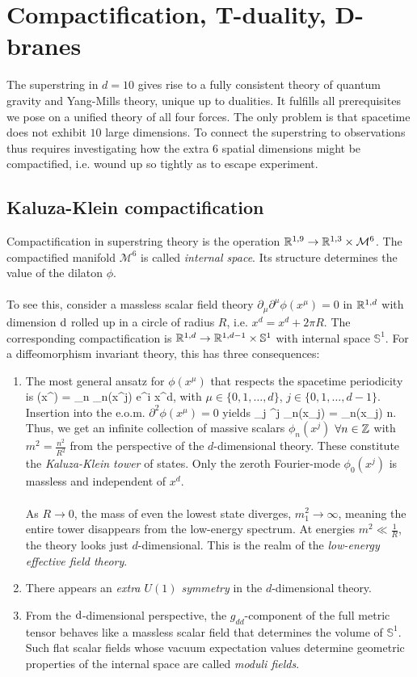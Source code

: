\section{Compactification, T-duality, D-branes}
The superstring in $d=10$ gives rise to a fully consistent theory of quantum gravity and Yang-Mills theory, unique up to dualities. It fulfills all prerequisites we pose on a unified theory of all four forces. The only problem is that spacetime does not exhibit $10$ large dimensions. To connect the superstring to observations thus requires investigating how the extra $6$ spatial dimensions might be compactified, i.e. wound up so tightly as to escape experiment.


\subsection{Kaluza-Klein compactification}
Compactification in superstring theory is the operation $\mathbb{R}^{1,9}\rightarrow \mathbb{R}^{1,3} \times \mathcal{M}^6$. The compactified manifold $\mathcal{M}^6$ is called \emph{internal space}. Its structure determines the value of the dilaton $\phi$.\\
\\
To see this, consider a massless scalar field theory $\partial_\mu \partial^\mu \phi(x^\mu)=0$ in $\mathbb{R}^{1,d}$ with dimension $\mathrm{d}$ rolled up in a circle of radius $R$, i.e. $x^d= x^d +2 \pi R$. The corresponding compactification is $\mathbb{R}^{1,d} \rightarrow \mathbb{R}^{1,d-1} \times \mathbb{S}^{1}$ with internal space $\mathbb{S}^1$. For a diffeomorphism invariant theory, this has three consequences:
\begin{enumerate}
	\item The most general ansatz for $\phi(x^\mu)$ that respects the spacetime periodicity is
	\be 
	\phi(x^\mu) = \sum_{n\in\Z} \phi_n(x^j) e^{i  x^d},
	\ee 
	with $\mu \in \{0,1,\dots,d\}$, $j\in \{0,1,\dots,d-1\}$. Insertion into the e.o.m. $\partial^2 \phi(x^\mu)=0$ yields
	\be 
	\partial_j \partial^j \phi_n(x_j) = \phi_n(x_j) \quad \forall n.
	\ee 
	Thus, we get an infinite collection of massive scalars $\phi_n(x^j)$ $\forall n \in\mathbb{Z}$ with $m^2 = \frac{n^2}{R^2}$ from the perspective of the $d$-dimensional theory. These constitute the \emph{Kaluza-Klein tower} of states. Only the zeroth Fourier-mode $\phi_0(x^j)$ is massless and independent of $x^d$. \\
	\\
	As $R\rightarrow 0$, the mass of even the lowest state diverges, $m^2_1 \rightarrow \infty$, meaning the entire tower disappears from the low-energy spectrum. At energies $m^2 \ll \frac{1 }{R}$,  the theory looks just $d$-dimensional. This is the realm of the \emph{low-energy effective field theory}.
	\item There appears an \emph{extra $U(1)$ symmetry} in the $d$-dimensional theory.
	\item From the $\mathrm{d}$-dimensional perspective, the $g_{dd}$-component of the full metric tensor behaves like a massless scalar field that determines the volume of $\mathbb{S}^1$. Such flat scalar fields whose vacuum expectation values determine geometric properties of the internal space are called \emph{moduli fields}.
\end{enumerate}
